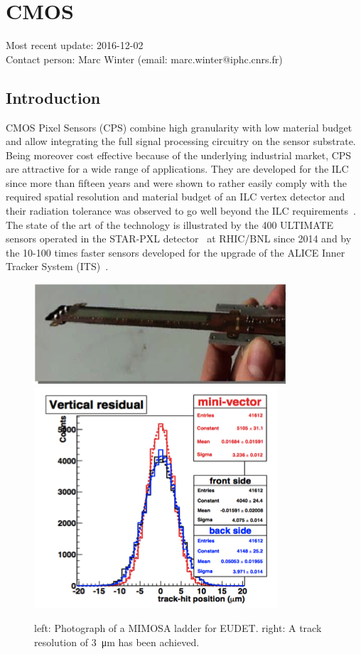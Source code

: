\section{CMOS}
Most recent update: 2016-12-02 \\
Contact person: Marc Winter (email: marc.winter@iphc.cnrs.fr)
\subsection{Introduction}
CMOS Pixel Sensors (CPS) combine high granularity with low material
budget and allow integrating the full signal processing circuitry on
the sensor substrate. Being moreover cost effective because of the
underlying industrial market, CPS are attractive for a wide range of
applications. They are developed for the ILC since more than fifteen
years and were shown to rather easily comply with the required spatial
resolution and material budget of an ILC vertex detector and their
radiation tolerance was observed to go well beyond the ILC requirements~\cite{Behnke:2013lya}. The state of the art of the technology is illustrated
by the 400 ULTIMATE sensors operated in the STAR-PXL detector~\cite{Greiner201168}
at RHIC/BNL since 2014 and by the 10-100 times faster
sensors developed for the upgrade of the ALICE Inner Tracker System
(ITS)~\cite{0954-3899-41-8-087002}.

\begin{figure}
	\centering
	\includegraphics[width=.5\linewidth]{VertexDetector/CMOS/Ladder}
	\includegraphics[width=.34\linewidth]{VertexDetector/CMOS/trackResolution.png}
	\caption{left: Photograph of a MIMOSA ladder for EUDET. right: A track resolution of \SI{3}{\micro\meter} has been achieved.}
	\label{fig:VertexDetector:CMOS}
\end{figure}

